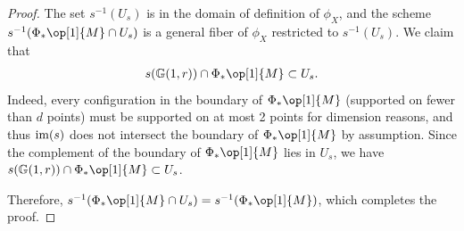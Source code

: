 \documentclass[12pt]{amsart}
\newcommand{\mb}{\mathbb}
\newcommand{\mc}{\mathcal}
\newcommand{\im}{{\rm im}}
\theoremstyle{plain}
\theoremstyle{definition}
\theoremstyle{remark}
\begin{document}
\begin{proof}
The set $s^{-1}(U_s)$ is in the domain of definition of $\phi_X$, and the scheme $s^{-1}(\Phi_*\op[1]{M}\cap U_{s})$ is a general fiber of $\phi_X$ restricted to $s^{-1}(U_s)$. We claim that 
\begin{align*}
s(\mb{G}(1,r))\cap \Phi_*\op[1]{M}\subset U_s.
\end{align*}
Indeed, every configuration in the boundary of $\Phi_*\op[1]{M}$ (supported on fewer than $d$ points) must be supported on at most 2 points for dimension reasons, and thus $\im(s)$ does not intersect the boundary of $\Phi_*\op[1]{M}$ by assumption. Since the complement of the boundary of $\Phi_*\op[1]{M}$ lies in $U_s$, we have $s(\mb{G}(1,r))\cap \Phi_*\op[1]{M}\subset U_s$. 

Therefore, $s^{-1}(\Phi_*\op[1]{M}\cap U_{s})= s^{-1}(\Phi_*\op[1]{M})$, which completes the proof.

\end{proof}
\end{document}
